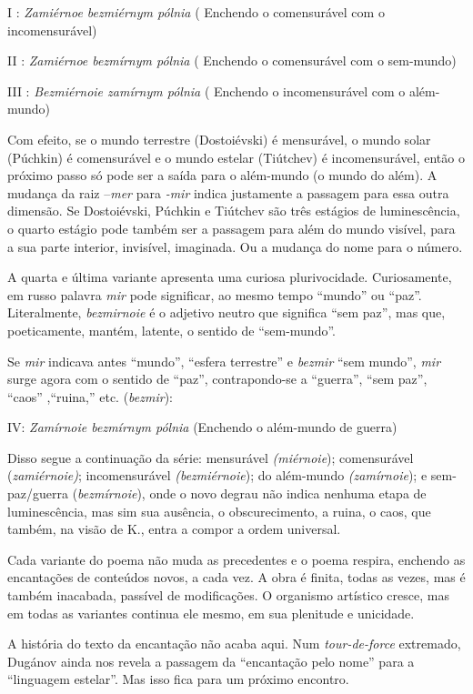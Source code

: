 I : \emph{Zamiérnoe bezmiérnym pólnia} ( Enchendo o comensurável com o
incomensurável)

II : \emph{Zamiérnoe bezmírnym pólnia} ( Enchendo o comensurável com o
sem-mundo)

III : \emph{Bezmiérnoie zamírnym pólnia} ( Enchendo o incomensurável com
o além-mundo)

Com efeito, se o mundo terrestre (Dostoiévski) é mensurável, o mundo
solar (Púchkin) é comensurável e o mundo estelar (Tiútchev) é
incomensurável, então o próximo passo só pode ser a saída para o
além-mundo (o mundo do além). A mudança da raiz --\emph{mer} para
\emph{-mir} indica justamente a passagem para essa outra dimensão. Se
Dostoiévski, Púchkin e Tiútchev são três estágios de luminescência, o
quarto estágio pode também ser a passagem para além do mundo visível,
para a sua parte interior, invisível, imaginada. Ou a mudança do nome
para o número.

A quarta e última variante apresenta uma curiosa plurivocidade.
Curiosamente, em russo palavra \emph{mir} pode significar, ao mesmo
tempo ``mundo'' ou ``paz''. Literalmente, \emph{bezmirnoie} é o adjetivo
neutro que significa ``sem paz'', mas que, poeticamente, mantém,
latente, o sentido de ``sem-mundo''.

Se \emph{mir} indicava antes ``mundo'', ``esfera terrestre'' e
\emph{bezmir} ``sem mundo'', \emph{mir} surge agora com o sentido de
``paz'', contrapondo-se a ``guerra'', ``sem paz'', ``caos'' ,``ruina,''
etc. (\emph{bezmir}):

IV: \emph{Zamírnoie bezmírnym pólnia} (Enchendo o além-mundo de guerra)

Disso segue a continuação da série: mensurável \emph{(miérnoie});
comensurável (\emph{zamiérnoie)}; incomensurável \emph{(bezmiérnoie});
do além-mundo \emph{(zamírnoie}); e sem-paz/guerra (\emph{bezmírnoie}),
onde o novo degrau não indica nenhuma etapa de luminescência, mas sim
sua ausência, o obscurecimento, a ruina, o caos, que também, na visão de
K., entra a compor a ordem universal.

Cada variante do poema não muda as precedentes e o poema respira,
enchendo as encantações de conteúdos novos, a cada vez. A obra é finita,
todas as vezes, mas é também inacabada, passível de modificações. O
organismo artístico cresce, mas em todas as variantes continua ele
mesmo, em sua plenitude e unicidade.

A história do texto da encantação não acaba aqui. Num
\emph{tour-de-force} extremado, Dugánov ainda nos revela a passagem da
``encantação pelo nome'' para a ``linguagem estelar''. Mas isso fica
para um próximo encontro.

